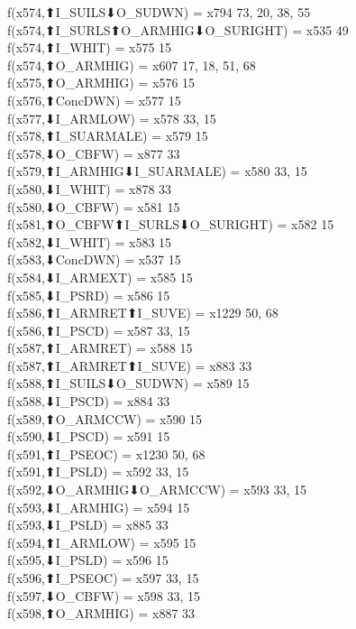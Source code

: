 f(x574,⬆I_SUILS⬇O_SUDWN) = x794 {73, 20, 38, 55} \\
f(x574,⬆I_SURLS⬆O_ARMHIG⬇O_SURIGHT) = x535 {49} \\
f(x574,⬆I_WHIT) = x575 {15} \\
f(x574,⬆O_ARMHIG) = x607 {17, 18, 51, 68} \\
f(x575,⬆O_ARMHIG) = x576 {15} \\
f(x576,⬆ConcDWN) = x577 {15} \\
f(x577,⬇I_ARMLOW) = x578 {33, 15} \\
f(x578,⬆I_SUARMALE) = x579 {15} \\
f(x578,⬇O_CBFW) = x877 {33} \\
f(x579,⬆I_ARMHIG⬇I_SUARMALE) = x580 {33, 15} \\
f(x580,⬇I_WHIT) = x878 {33} \\
f(x580,⬇O_CBFW) = x581 {15} \\
f(x581,⬆O_CBFW⬆I_SURLS⬇O_SURIGHT) = x582 {15} \\
f(x582,⬇I_WHIT) = x583 {15} \\
f(x583,⬇ConcDWN) = x537 {15} \\
f(x584,⬇I_ARMEXT) = x585 {15} \\
f(x585,⬇I_PSRD) = x586 {15} \\
f(x586,⬆I_ARMRET⬆I_SUVE) = x1229 {50, 68} \\
f(x586,⬆I_PSCD) = x587 {33, 15} \\
f(x587,⬆I_ARMRET) = x588 {15} \\
f(x587,⬆I_ARMRET⬆I_SUVE) = x883 {33} \\
f(x588,⬆I_SUILS⬇O_SUDWN) = x589 {15} \\
f(x588,⬇I_PSCD) = x884 {33} \\
f(x589,⬆O_ARMCCW) = x590 {15} \\
f(x590,⬇I_PSCD) = x591 {15} \\
f(x591,⬆I_PSEOC) = x1230 {50, 68} \\
f(x591,⬆I_PSLD) = x592 {33, 15} \\
f(x592,⬇O_ARMHIG⬇O_ARMCCW) = x593 {33, 15} \\
f(x593,⬇I_ARMHIG) = x594 {15} \\
f(x593,⬇I_PSLD) = x885 {33} \\
f(x594,⬆I_ARMLOW) = x595 {15} \\
f(x595,⬇I_PSLD) = x596 {15} \\
f(x596,⬆I_PSEOC) = x597 {33, 15} \\
f(x597,⬇O_CBFW) = x598 {33, 15} \\
f(x598,⬆O_ARMHIG) = x887 {33} \\
